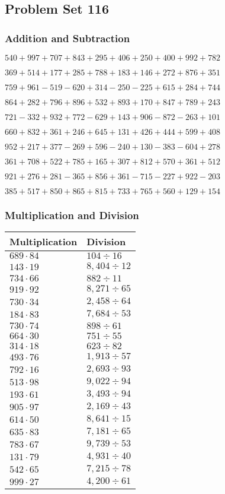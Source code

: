 \hypertarget{problem-set-116}{%
\subsection{Problem Set 116}\label{problem-set-116}}

\hypertarget{addition-and-subtraction}{%
\subsubsection{Addition and
Subtraction}\label{addition-and-subtraction}}

\(540 +997 +707 +843 +295 +406 +250 +400 +992 +782\)

\(369 +514 +177 +285 +788 +183 +146 +272 +876 +351\)

\(759 +961 - 519 - 620 +314 - 250 - 225 +615 +284 +744\)

\(864 +282 +796 +896 +532 +893 +170 +847 +789 +243\)

\(721 - 332 +932 +772 - 629 +143 +906 - 872 - 263 +101\)

\(660 +832 +361 +246 +645 +131 +426 +444 +599 +408\)

\(952 +217 +377 - 269 +596 - 240 +130 - 383 - 604 +278\)

\(361 +708 +522 +785 +165 +307 +812 +570 +361 +512\)

\(921 +276 +281 - 365 +856 +361 - 715 - 227 +922 - 203\)

\(385 +517 +850 +865 +815 +733 +765 +560 +129 +154\)

\hypertarget{multiplication-and-division}{%
\subsubsection{Multiplication and
Division}\label{multiplication-and-division}}

\begin{longtable}[]{@{}ll@{}}
\toprule
Multiplication & Division\tabularnewline
\midrule
\endhead
\(689 \cdot 84\) & \(104÷16\)\tabularnewline
\(143 \cdot 19\) & \(8,404÷12\)\tabularnewline
\(734 \cdot 66\) & \(882÷11\)\tabularnewline
\(919 \cdot 92\) & \(8,271÷65\)\tabularnewline
\(730 \cdot 34\) & \(2,458÷64\)\tabularnewline
\(184 \cdot 83\) & \(7,684÷53\)\tabularnewline
\(730 \cdot 74\) & \(898÷61\)\tabularnewline
\(664 \cdot 30\) & \(751÷55\)\tabularnewline
\(314 \cdot 18\) & \(623÷82\)\tabularnewline
\(493 \cdot 76\) & \(1,913÷57\)\tabularnewline
\(792 \cdot 16\) & \(2,693÷93\)\tabularnewline
\(513 \cdot 98\) & \(9,022÷94\)\tabularnewline
\(193 \cdot 61\) & \(3,493÷94\)\tabularnewline
\(905 \cdot 97\) & \(2,169÷43\)\tabularnewline
\(614 \cdot 50\) & \(8,641÷15\)\tabularnewline
\(635 \cdot 83\) & \(7,181÷65\)\tabularnewline
\(783 \cdot 67\) & \(9,739÷53\)\tabularnewline
\(131 \cdot 79\) & \(4,931÷40\)\tabularnewline
\(542 \cdot 65\) & \(7,215÷78\)\tabularnewline
\(999 \cdot 27\) & \(4,200÷61\)\tabularnewline
\bottomrule
\end{longtable}
